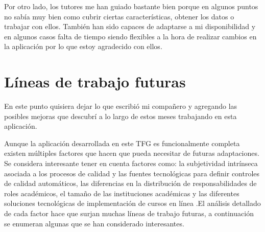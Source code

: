 Por otro lado, los tutores me han guiado bastante bien porque en algunos puntos no sabía muy bien como cubrir ciertas características, obtener los datos o trabajar con ellos. También han sido capaces de adaptarse a mi disponibilidad y en algunos casos falta de tiempo siendo flexibles a la hora de realizar cambios en la aplicación por lo que estoy agradecido con ellos.

\section{Líneas de trabajo futuras}
En este punto quisiera dejar lo que escribió mi compañero y agregando las posibles mejoras que descubrí a lo largo de estos meses trabajando en esta aplicación.

Aunque la aplicación desarrollada en este TFG es funcionalmente completa existen múltiples factores que hacen que pueda necesitar de futuras adaptaciones. Se considera interesante tener en cuenta factores como: la subjetividad intrínseca asociada a los procesos de calidad y las fuentes tecnológicas para definir controles de calidad automáticos, las diferencias en la distribución de responsabilidades de roles académicos, el tamaño de las instituciones académicas y las diferentes soluciones tecnológicas de implementación de cursos en línea .El análisis detallado de cada factor hace que surjan muchas líneas de trabajo futuras, a continuación se enumeran algunas que se han considerado interesantes.
